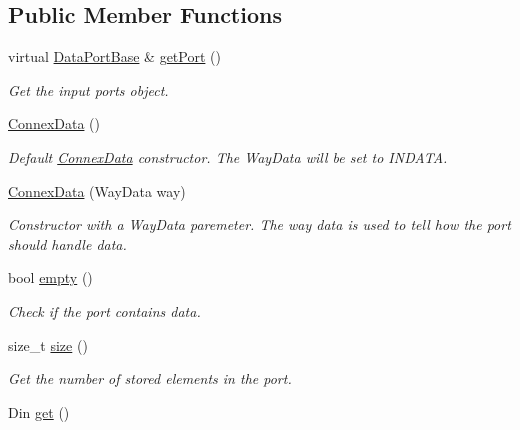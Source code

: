 \subsection*{Public Member Functions}
\begin{DoxyCompactItemize}
\item 
virtual \hyperlink{classfilter_1_1data_1_1_data_port_base}{Data\+Port\+Base} \& \hyperlink{classfilter_1_1data_1_1_connex_data_aecd47354b992800c9d9e69ad951382fb}{get\+Port} ()
\begin{DoxyCompactList}\small\item\em Get the input port\textquotesingle{}s object. \end{DoxyCompactList}\item 
\mbox{\label{classfilter_1_1data_1_1_connex_data_af0e6940e300521b1ecc09c367c8960e2}} 
\hyperlink{classfilter_1_1data_1_1_connex_data_af0e6940e300521b1ecc09c367c8960e2}{Connex\+Data} ()
\begin{DoxyCompactList}\small\item\em Default \hyperlink{classfilter_1_1data_1_1_connex_data}{Connex\+Data} constructor. The Way\+Data will be set to I\+N\+D\+A\+TA. \end{DoxyCompactList}\item 
\hyperlink{classfilter_1_1data_1_1_connex_data_a294f855ae8f4b203c8413a32f7e0c692}{Connex\+Data} (Way\+Data way)
\begin{DoxyCompactList}\small\item\em Constructor with a Way\+Data paremeter. The way data is used to tell how the port should handle data. \end{DoxyCompactList}\item 
bool \hyperlink{classfilter_1_1data_1_1_connex_data_a6ae80a4f012442066057ee23dcb6c363}{empty} ()
\begin{DoxyCompactList}\small\item\em Check if the port contains data. \end{DoxyCompactList}\item 
size\+\_\+t \hyperlink{classfilter_1_1data_1_1_connex_data_aed293788ed40932ede5d3a30469f5cfd}{size} ()
\begin{DoxyCompactList}\small\item\em Get the number of stored elements in the port. \end{DoxyCompactList}\item 
Din \hyperlink{classfilter_1_1data_1_1_connex_data_aa7d702b864f00b42b325d2eb6c0a9e91}{get} ()

\end{DoxyCompactItemize}
